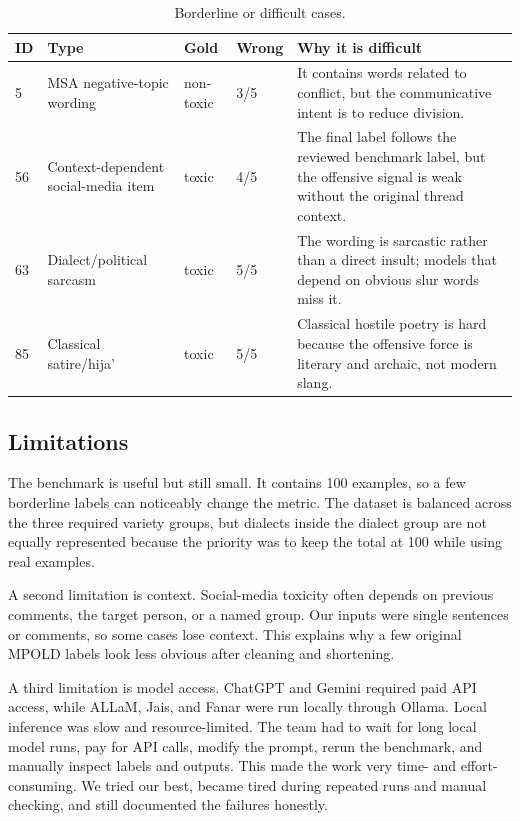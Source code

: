 \begin{table}[H]
\centering
\caption{Borderline or difficult cases.}
\label{tab:problem5-borderline}
\scriptsize
\begin{tabular}{p{}p{}p{}p{}p{}}
\toprule
ID & Type & Gold & Wrong & Why it is difficult \\
\midrule
5 & MSA negative-topic wording & non-toxic & 3/5 & It contains words related to conflict, but the communicative intent is to reduce division. \\
56 & Context-dependent social-media item & toxic & 4/5 & The final label follows the reviewed benchmark label, but the offensive signal is weak without the original thread context. \\
63 & Dialect/political sarcasm & toxic & 5/5 & The wording is sarcastic rather than a direct insult; models that depend on obvious slur words miss it. \\
85 & Classical satire/hija' & toxic & 5/5 & Classical hostile poetry is hard because the offensive force is literary and archaic, not modern slang. \\
\bottomrule
\end{tabular}
\end{table}

\subsection{Limitations}
The benchmark is useful but still small. It contains 100 examples, so a few borderline labels can noticeably change the metric. The dataset is balanced across the three required variety groups, but dialects inside the dialect group are not equally represented because the priority was to keep the total at 100 while using real examples.

A second limitation is context. Social-media toxicity often depends on previous comments, the target person, or a named group. Our inputs were single sentences or comments, so some cases lose context. This explains why a few original MPOLD labels look less obvious after cleaning and shortening.

A third limitation is model access. ChatGPT and Gemini required paid API access, while ALLaM, Jais, and Fanar were run locally through Ollama. Local inference was slow and resource-limited. The team had to wait for long local model runs, pay for API calls, modify the prompt, rerun the benchmark, and manually inspect labels and outputs. This made the work very time- and effort-consuming. We tried our best, became tired during repeated runs and manual checking, and still documented the failures honestly.

